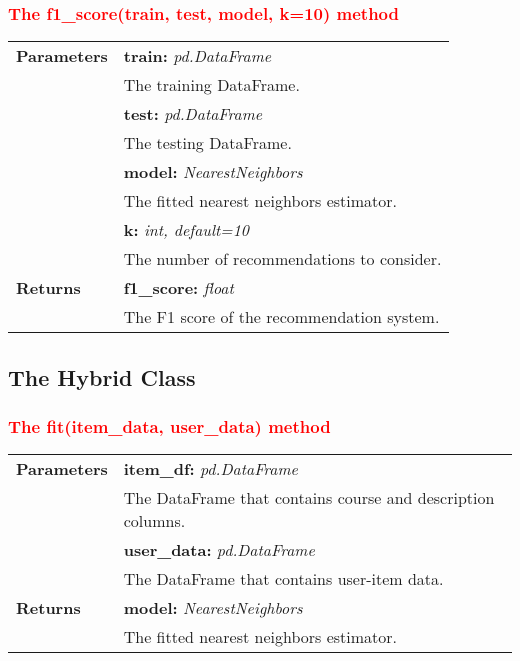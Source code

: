 \subsubsection{\textcolor{red}{The f1\_score(train, test, model, k=10) method}}

\vspace{-7mm}
\begin{table}[H]
\small
\begin{tabularx}{\textwidth}{|p{2cm}|X|}
\hline
\textbf{Parameters} & \textbf{train:} \textit{pd.DataFrame} \\ & \hspace{5mm} The training DataFrame. \\
& \textbf{test:} \textit{pd.DataFrame} \\ & \hspace{5mm} The testing DataFrame. \\
& \textbf{model:} \textit{NearestNeighbors} \\ & \hspace{5mm} The fitted nearest neighbors estimator. \\
& \textbf{k:} \textit{int, default=10} \\ & \hspace{5mm} The number of recommendations to consider. \\
\textbf{Returns} & \textbf{f1\_score:} \textit{float} \\ & \hspace{5mm} The F1 score of the recommendation system. \\
\hline
\end{tabularx}
\end{table}

\subsection{The Hybrid Class}

\subsubsection{\textcolor{red}{The fit(item\_data, user\_data) method}}

\vspace{-7mm}
\begin{table}[H]
\small
\begin{tabularx}{\textwidth}{|p{2cm}|X|}
\hline
\textbf{Parameters} & \textbf{item\_df:} \textit{pd.DataFrame} \\ & \hspace{5mm} The DataFrame that contains course and description columns. \\
& \textbf{user\_data:} \textit{pd.DataFrame} \\ & \hspace{5mm} The DataFrame that contains user-item data. \\
\textbf{Returns} & \textbf{model:} \textit{NearestNeighbors} \\ & \hspace{5mm} The fitted nearest neighbors estimator. \\
\hline
\end{tabularx}
\end{table}

